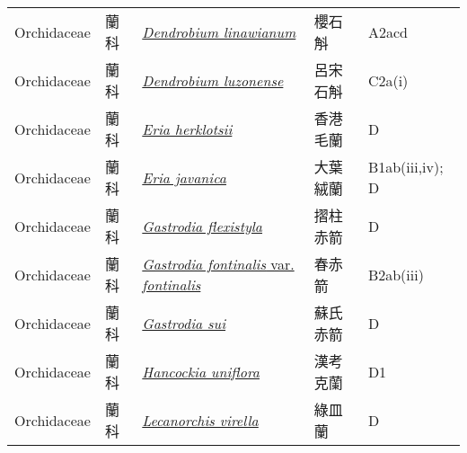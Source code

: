 {\begin{longtable}{L{2.5cm}L{2cm}L{5cm}L{2.5cm}L{3cm}}
    Orchidaceae & 蘭科 & \href{http://www.theplantlist.org/tpl1.1/search?q=Dendrobium+linawianum}{\textit{Dendrobium linawianum} } & 櫻石斛 & A2acd    \\
    Orchidaceae & 蘭科 & \href{http://www.theplantlist.org/tpl1.1/search?q=Dendrobium+luzonense}{\textit{Dendrobium luzonense} } & 呂宋石斛 & C2a(i)    \\
    Orchidaceae & 蘭科 & \href{http://www.theplantlist.org/tpl1.1/search?q=Eria+herklotsii}{\textit{Eria herklotsii} } & 香港毛蘭 & D    \\
    Orchidaceae & 蘭科 & \href{http://www.theplantlist.org/tpl1.1/search?q=Eria+javanica}{\textit{Eria javanica} } & 大葉絨蘭 & B1ab(iii,iv); D    \\
    Orchidaceae & 蘭科 & \href{http://www.theplantlist.org/tpl1.1/search?q=Gastrodia+flexistyla}{\textit{Gastrodia flexistyla} } & 摺柱赤箭 & D    \\
    Orchidaceae & 蘭科 & \href{http://www.theplantlist.org/tpl1.1/search?q=Gastrodia+fontinalis+var.+fontinalis}{\textit{Gastrodia fontinalis} var. \textit{fontinalis} } & 春赤箭 & B2ab(iii)    \\
    Orchidaceae & 蘭科 & \href{http://www.theplantlist.org/tpl1.1/search?q=Gastrodia+sui}{\textit{Gastrodia sui} } & 蘇氏赤箭 & D    \\
    Orchidaceae & 蘭科 & \href{http://www.theplantlist.org/tpl1.1/search?q=Hancockia+uniflora}{\textit{Hancockia uniflora} } & 漢考克蘭 & D1    \\
    Orchidaceae & 蘭科 & \href{http://www.theplantlist.org/tpl1.1/search?q=Lecanorchis+virella}{\textit{Lecanorchis virella} } & 綠皿蘭 & D    \\

\end{longtable}}
